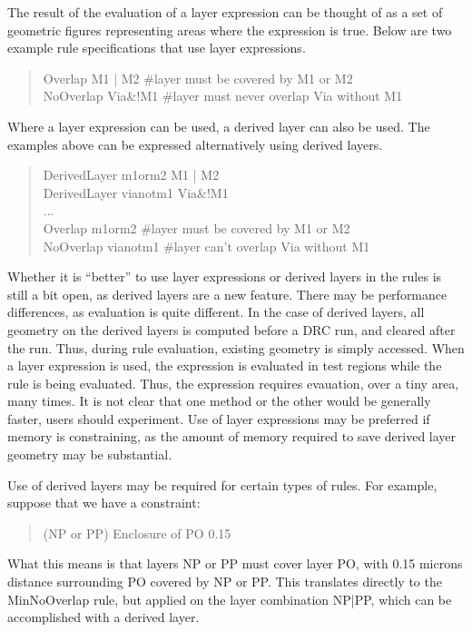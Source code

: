 The result of the evaluation of a layer expression can be thought of
as a set of geometric figures representing areas where the expression
is true.  Below are two example rule specifications that use layer
expressions.

\begin{quote}
{\vt Overlap M1 | M2  \#layer must be covered by M1 or M2}\\
{\vt NoOverlap Via\&!M1 \#layer must never overlap Via without M1}
\end{quote}

Where a layer expression can be used, a derived layer can also be used.
The examples above can be expressed alternatively using derived layers.

\begin{quote} \vt
DerivedLayer m1orm2 M1 | M2\\
DerivedLayer vianotm1 Via\&!M1\\
...\\
Overlap m1orm2  \#layer must be covered by M1 or M2\\
NoOverlap vianotm1 \#layer can't overlap Via without M1
\end{quote}

Whether it is ``better'' to use layer expressions or derived layers in
the rules is still a bit open, as derived layers are a new feature. 
There may be performance differences, as evaluation is quite
different.  In the case of derived layers, all geometry on the derived
layers is computed before a DRC run, and cleared after the run.  Thus,
during rule evaluation, existing geometry is simply accessed.  When a
layer expression is used, the expression is evaluated in test regions
while the rule is being evaluated.  Thus, the expression requires
evauation, over a tiny area, many times.  It is not clear that one
method or the other would be generally faster, users should
experiment.  Use of layer expressions may be preferred if memory is
constraining, as the amount of memory required to save derived layer
geometry may be substantial.

Use of derived layers may be required for certain types of rules.
For example, suppose that we have a constraint:
\begin{quote}\vt
(NP or PP) Enclosure of PO 0.15
\end{quote}

What this means is that layers NP or PP must cover layer PO, with 0.15
microns distance surrounding PO covered by NP or PP.  This translates
directly to the {\vt MinNoOverlap} rule, but applied on the layer
combination NP{\vt |}PP, which can be accomplished with a derived layer.

